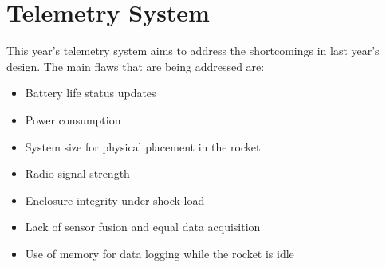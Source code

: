 \section{Telemetry System}

This year's telemetry system aims to address the shortcomings in last year's design. The main flaws that are being
addressed are:

\begin{itemize}
    \item Battery life status updates
    \item Power consumption
    \item System size for physical placement in the rocket
    \item Radio signal strength
    \item Enclosure integrity under shock load
    \item Lack of sensor fusion and equal data acquisition
    \item Use of memory for data logging while the rocket is idle
\end{itemize}
